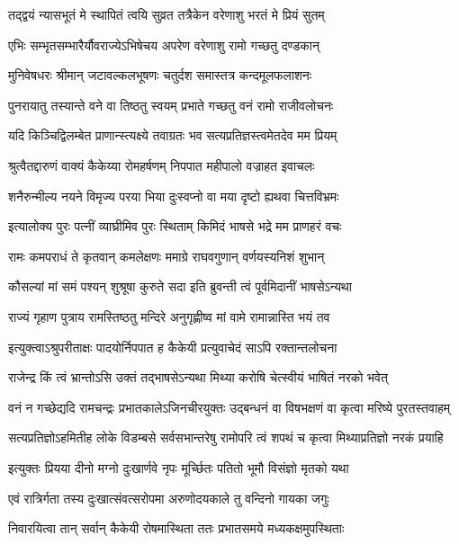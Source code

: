 \twolineshloka
{तद्द्वयं न्यासभूतं मे स्थापितं त्वयि सुव्रत}
{तत्रैकेन वरेणाशु भरतं मे प्रियं सुतम्} %

\twolineshloka
{एभिः सम्भृतसम्भारैर्यौवराज्येऽभिषेचय}
{अपरेण वरेणाशु रामो गच्छतु दण्डकान्} %

\twolineshloka
{मुनिवेषधरः श्रीमान् जटावल्कलभूषणः}
{चतुर्दश समास्तत्र कन्दमूलफलाशनः} %

\twolineshloka
{पुनरायातु तस्यान्ते वने वा तिष्ठतु स्वयम्}
{प्रभाते गच्छतु वनं रामो राजीवलोचनः} %

\twolineshloka
{यदि किञ्चिद्विलम्बेत प्राणान्स्त्यक्ष्ये तवाग्रतः}
{भव सत्यप्रतिज्ञस्त्वमेतदेव मम प्रियम्} %

\twolineshloka
{श्रुत्वैतद्दारुणं वाक्यं कैकेय्या रोमहर्षणम्}
{निपपात महीपालो वज्राहत इवाचलः} %

\twolineshloka
{शनैरुन्मील्य नयने विमृज्य परया भिया}
{दुःस्वप्नो वा मया दृष्टो ह्यथवा चित्तविभ्रमः} %

\twolineshloka
{इत्यालोक्य पुरः पत्नीं व्याघ्रीमिव पुरः स्थिताम्}
{किमिदं भाषसे भद्रे मम प्राणहरं वचः} %

\twolineshloka
{रामः कमपराधं ते कृतवान् कमलेक्षणः}
{ममाग्रे राघवगुणान् वर्णयस्यनिशं शुभान्} %

\twolineshloka
{कौसल्यां मां समं पश्यन् शुश्रूषा कुरुते सदा}
{इति ब्रुवन्ती त्वं पूर्वमिदानीं भाषसेऽन्यथा} %

\twolineshloka
{राज्यं गृहाण पुत्राय रामस्तिष्ठतु मन्दिरे}
{अनुगृह्णीष्व मां वामे रामान्नास्ति भयं तव} %

\twolineshloka
{इत्युक्त्वाऽश्रुपरीताक्षः पादयोर्निपपात ह}
{कैकेयी प्रत्युवाचेदं साऽपि रक्तान्तलोचना} %

\twolineshloka
{राजेन्द्र किं त्वं भ्रान्तोऽसि उक्तं तद्भाषसेऽन्यथा}
{मिथ्या करोषि चेत्स्वीयं भाषितं नरको भवेत्} %

\fourlineindentedshloka
{वनं न गच्छेद्यदि रामचन्द्रः}
{प्रभातकालेऽजिनचीरयुक्तः}
{उद्बन्धनं वा विषभक्षणं वा}
{कृत्वा मरिष्ये पुरतस्तवाहम्} %

\fourlineindentedshloka
{सत्यप्रतिज्ञोऽहमितीह लोके}
{विडम्बसे सर्वसभान्तरेषु}
{रामोपरि त्वं शपथं च कृत्वा}
{मिथ्याप्रतिज्ञो नरकं प्रयाहि} %

\twolineshloka
{इत्युक्तः प्रियया दीनो मग्नो दुःखार्णवे नृपः}
{मूर्च्छितः पतितो भूमौ विसंज्ञो मृतको यथा} %

\twolineshloka
{एवं रात्रिर्गता तस्य दुःखात्संवत्सरोपमा}
{अरुणोदयकाले तु वन्दिनो गायका जगुः} %

\twolineshloka
{निवारयित्वा तान् सर्वान् कैकेयी रोषमास्थिता}
{ततः प्रभातसमये मध्यकक्षमुपस्थिताः} %

